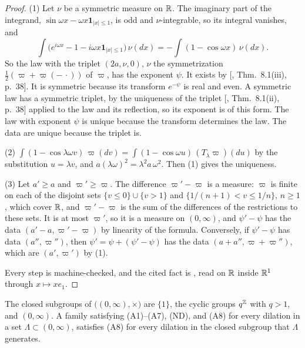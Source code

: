 \begin{proof}
(1) Let $\nu$ be a symmetric \Levy{} measure on $\mathbb{R}$. The imaginary part of the integrand,
$\sin\omega x - \omega x\mathbf 1_{|x| \le 1}$, is odd and $\nu$-integrable, so its integral
vanishes, and
\[
  \int\bigl(e^{i\omega x} - 1 - i\omega x\mathbf 1_{|x| \le 1}\bigr)\,\nu(dx)
  = -\int(1 - \cos\omega x)\,\nu(dx).
\]
So the law with the triplet $(2a, \nu, 0)$, $\nu$ the symmetrization $\tfrac12(\varpi + \varpi(-\,\cdot))$
of $\varpi$, has the exponent $\psi$. It exists by [, Thm.~8.1(iii),
p.~38]. It is symmetric because its transform $e^{-\psi}$ is real and even. A symmetric law
has a symmetric triplet, by the uniqueness of the triplet [, Thm.~8.1(ii),
p.~38] applied to the law and its
reflection, so its exponent is of this form. The law with exponent $\psi$ is unique because the
transform determines the law. The data are unique because the triplet is.

(2) $\int(1 - \cos\lambda\omega v)\,\varpi(dv) = \int(1 - \cos\omega u)\,(T_\lambda\varpi)(du)$ by
the substitution $u = \lambda v$, and $a(\lambda\omega)^2 = \lambda^2a\,\omega^2$. Then (1) gives
the uniqueness.

(3) Let $a' \ge a$ and $\varpi' \ge \varpi$. The difference $\varpi' - \varpi$ is a measure: $\varpi$
is finite on each of the disjoint sets $\{v \le 0\} \cup \{v > 1\}$ and
$\{1/(n+1) < v \le 1/n\}$, $n \ge 1$, which cover $\mathbb{R}$, and $\varpi' - \varpi$ is the sum of the
differences of the restrictions to these sets. It is at most $\varpi'$, so it is a \Levy{} measure
on $(0,\infty)$, and $\psi' - \psi$ has the data $(a' - a, \varpi' - \varpi)$ by linearity of the
formula. Conversely, if $\psi' - \psi$ has data $(a'', \varpi'')$, then $\psi' = \psi + (\psi' - \psi)$
has the data $(a + a'', \varpi + \varpi'')$, which are $(a', \varpi')$ by (1).

Every step is machine-checked, and the cited fact is , read on $\mathbb{R}$ inside $\mathbb{R}^1$
through $x \mapsto xe_1$.
\end{proof}

\begin{lemma}
\label{lem:closed-subgroups}

The closed subgroups of $\bigl((0,\infty), \times\bigr)$ are $\{1\}$, the cyclic groups
$q^{\mathbb{Z}}$ with $q > 1$, and $(0,\infty)$. A family satisfying (A1)--(A7), (ND), and (A8) for
every dilation in a set $\Lambda \subset (0,\infty)$, satisfies (A8) for every dilation in the
closed subgroup that $\Lambda$ generates.
\end{lemma}

